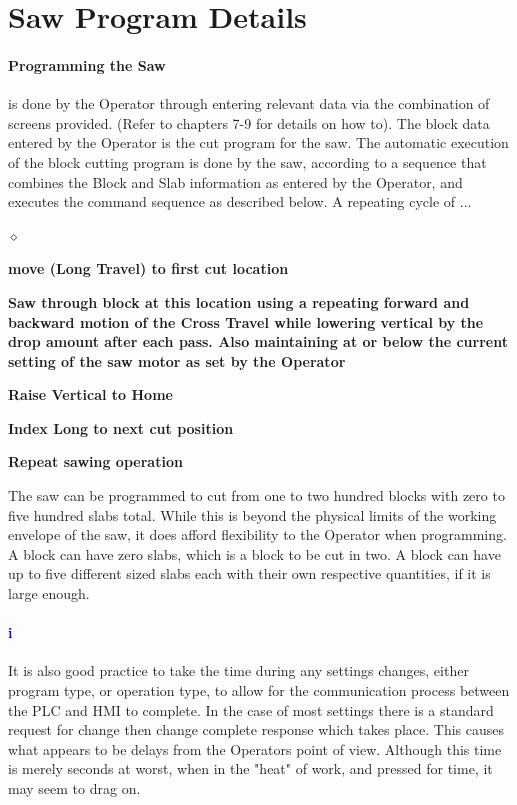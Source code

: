 \section{Saw Program Details}\paragraph*{Programming the Saw} is done by the Operator through entering relevant data via the combination of screens provided. (Refer to chapters 7-9 for details on how to). The block data entered by the Operator is the cut program for the saw. The automatic execution of the block cutting program is done by the saw, according to a sequence that combines the Block and Slab information as entered by the Operator, and executes the command sequence as described below. A repeating cycle of ...
\begin{list}{$\diamond$}{}
	\item \textbf{move (Long Travel) to first cut location}
	\item \textbf{Saw through block at this location using a repeating forward and backward motion of the Cross Travel while lowering vertical by the drop amount after each pass. Also maintaining at or below the current setting of the saw motor as set by the Operator}
	\item \textbf{Raise Vertical to Home}
	\item \textbf{Index Long to next cut position}
	\item \textbf{Repeat sawing operation}
\end{list}
The saw can be programmed to cut from one to two hundred blocks with zero to five hundred slabs total. While this is beyond the physical limits of the working envelope of the saw, it does afford flexibility to the Operator when programming. A block can have zero slabs, which is a block to be cut in two. A block can have up to five different sized slabs each with their own respective quantities, if it is large enough. 
\paragraph{\textbf{\LARGE \textcolor{blue}{i}}}It is also good practice to take the time during any settings changes, either program type, or operation type, to allow for the communication process between the PLC and HMI to complete. In the case of most settings there is a standard request for change then change complete response which takes place. This causes what appears to be delays from the Operators point of view. Although this time is merely seconds at worst, when in the "heat" of work, and pressed for time, it may seem to drag on.
